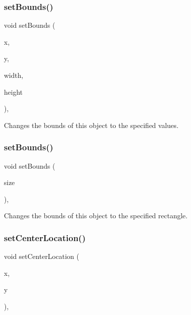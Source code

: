 \subsubsection{\texorpdfstring{set\+Bounds()}{setBounds()}\hspace{0.1cm}{\footnotesize\ttfamily [1/2]}}
{\footnotesize\ttfamily void set\+Bounds (\begin{DoxyParamCaption}\item[{double}]{x,  }\item[{double}]{y,  }\item[{double}]{width,  }\item[{double}]{height }\end{DoxyParamCaption})\hspace{0.3cm}{\ttfamily [virtual]}, {\ttfamily [inherited]}}



Changes the bounds of this object to the specified values. 

\mbox{\label{classsgl_1_1GObject_acada386653f008cacc7cce86426bef7c}} 
\subsubsection{\texorpdfstring{set\+Bounds()}{setBounds()}\hspace{0.1cm}{\footnotesize\ttfamily [2/2]}}
{\footnotesize\ttfamily void set\+Bounds (\begin{DoxyParamCaption}\item[{const \mbox{\hyperlink{structsgl_1_1GRectangle}{G\+Rectangle}} \&}]{size }\end{DoxyParamCaption})\hspace{0.3cm}{\ttfamily [virtual]}, {\ttfamily [inherited]}}



Changes the bounds of this object to the specified rectangle. 

\mbox{\label{classsgl_1_1GObject_a290b47dd8de1be44089f95cb2c47c1de}} 
\subsubsection{\texorpdfstring{set\+Center\+Location()}{setCenterLocation()}\hspace{0.1cm}{\footnotesize\ttfamily [1/2]}}
{\footnotesize\ttfamily void set\+Center\+Location (\begin{DoxyParamCaption}\item[{double}]{x,  }\item[{double}]{y }\end{DoxyParamCaption})\hspace{0.3cm}{\ttfamily [virtual]}, {\ttfamily [inherited]}}



